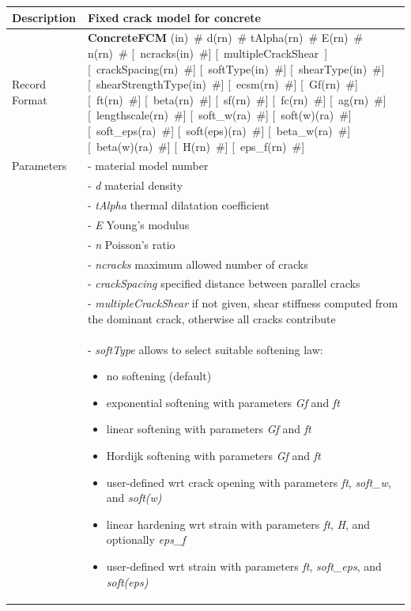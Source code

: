 \documentclass[a4paper]{article}
\newcommand{\descitem}[1]{{\noindent \bf #1}}
\newcommand{\elemparam}[2]{{{#1\tiny (#2)}~\#}}
\newcommand{\optelemparam}[2]{[{~\elemparam{#1}{#2}}]}
\newcommand{\elemstring}[1]{{#1}}
\newcommand{\optelemstring}[1]{[{~\elemstring{#1}~}]}
\newcommand{\param}[1]{{\it #1}}
\begin{document}
\begin{longtable}{|l|p{9cm}|}
\hline
Description & Fixed crack model for concrete\\
\hline
Record Format & \descitem{ConcreteFCM} 
\elemparam{}{in}
\elemparam{d}{rn} 
\elemparam{tAlpha}{rn}
\elemparam{E}{rn}
\elemparam{n}{rn}
\optelemparam{ncracks}{in}
\optelemstring{multipleCrackShear}
\optelemparam{crackSpacing}{rn}
\optelemparam{softType}{in}
\optelemparam{shearType}{in}
\optelemparam{shearStrengthType}{in}
\optelemparam{ecsm}{rn}
\optelemparam{Gf}{rn}
\optelemparam{ft}{rn} 
\optelemparam{beta}{rn} 
\optelemparam{sf}{rn} 
\optelemparam{fc}{rn} 
\optelemparam{ag}{rn} 
\optelemparam{lengthscale}{rn} 
\optelemparam{soft\_w}{ra} 
\optelemparam{soft(w)}{ra} 
\optelemparam{soft\_eps}{ra} 
\optelemparam{soft(eps)}{ra} 
\optelemparam{beta\_w}{ra} 
\optelemparam{beta(w)}{ra} 
\optelemparam{H}{rn} 
\optelemparam{eps\_f}{rn}
\\
Parameters &- \param{} material model number\\
&- \param{d} material density\\
&- \param{tAlpha} thermal dilatation coefficient\\
&- \param{E} Young's modulus\\
&- \param{n} Poisson's ratio\\
&- \param{ncracks} maximum allowed number of cracks\\
&- \param{crackSpacing} specified distance between parallel cracks\\
&- \param{multipleCrackShear} if not given, shear stiffness computed from the dominant crack, otherwise all cracks contribute\\
&- \param{softType} allows to select suitable softening law:
\begin{itemize}\setlength{\itemsep}{-3pt}
\item[0 -] no softening (default)
\item[1 -] exponential softening with parameters \param{Gf} and \param{ft}
\item[2 -] linear softening with parameters \param{Gf} and \param{ft}
\item[3 -] Hordijk softening with parameters \param{Gf} and \param{ft}
\item[4 -] user-defined wrt crack opening with parameters \param{ft}, \param{soft\_w}, and \param{soft(w)}
\item[5 -] linear hardening wrt strain with parameters \param{ft}, \param{H}, and optionally \param{eps\_f}
\item[6 -] user-defined wrt strain with parameters \param{ft}, \param{soft\_eps}, and \param{soft(eps)}

\end{itemize}
\end{longtable}
\end{document}
